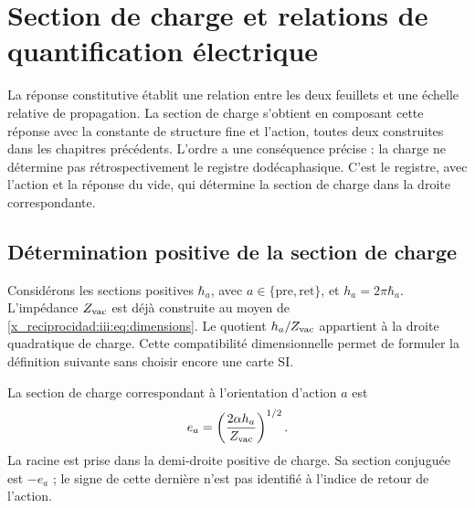

\chapter{Section de charge et relations de quantification électrique}
\label{x_reciprocidad:iii:sec:carga}

La réponse constitutive établit une relation entre les deux feuillets et une échelle relative de propagation. La section de charge s'obtient en composant cette réponse avec la constante de structure fine et l'action, toutes deux construites dans les chapitres précédents. L'ordre a une conséquence précise : la charge ne détermine pas rétrospectivement le registre dodécaphasique. C'est le registre, avec l'action et la réponse du vide, qui détermine la section de charge dans la droite correspondante.

\section{Détermination positive de la section de charge}

Considérons les sections positives $\hbar_a$, avec
$a\in\{\mathrm{pre},\mathrm{ret}\}$, et $h_a=2\pi\hbar_a$.
L’impédance $Z_{\rm vac}$ est déjà construite au moyen de
\eqref{x_reciprocidad:iii:eq:dimensions}. Le quotient $h_a/Z_{\rm vac}$ appartient à
la droite quadratique de charge. Cette compatibilité dimensionnelle permet
de formuler la définition suivante sans choisir encore une carte SI.

\begin{definition}
La section de charge correspondant à l’orientation d’action $a$ est
\begin{equation}
 e_a=\left(\frac{2\alpha h_a}{Z_{\rm vac}}\right)^{1/2}.
 \label{x_reciprocidad:iii:eq:charge}
\end{equation}
La racine est prise dans la demi-droite positive de charge. Sa section conjuguée
est $-e_a$ ; le signe de cette dernière n’est pas identifié à l’indice de
retour de l’action.
\end{definition}

